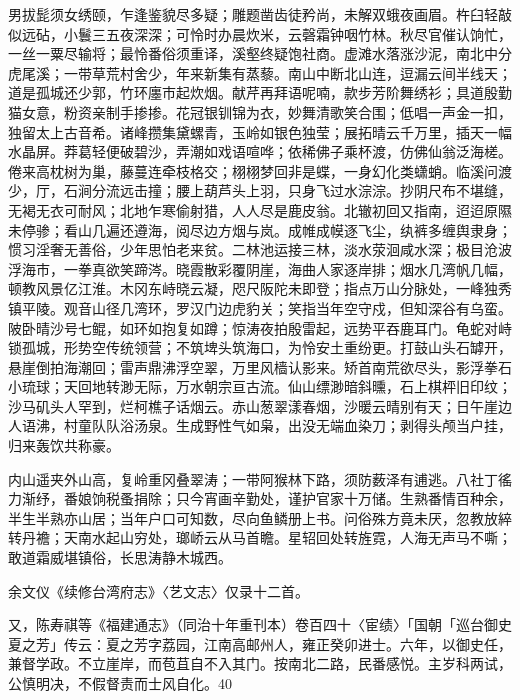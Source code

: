 \noindent 男拔髭须女绣颐，乍逢鉴貌尽多疑；雕题凿齿徒矜尚，未解双蛾夜画眉。杵臼轻敲似远砧，小鬟三五夜深深；可怜时办晨炊米，云磬霜钟咽竹林。秋尽官催认饷忙，一丝一粟尽输将；最怜番俗须重译，溪壑终疑饱社商。虚滩水落涨沙泥，南北中分虎尾溪；一带草荒村舍少，年来新集有蒸藜。南山中断北山连，逗漏云间半线天；道是孤城还少郭，竹环廛市起炊烟。献芹再拜语呢喃，款步芳阶舞绣衫；具道殷勤猫女意，粉资亲制手掺掺。花冠银钏锦为衣，妙舞清歌笑合围；低唱一声金一扣，独留太上古音希。诸峰攒集黛螺青，玉岭如银色独莹；展拓晴云千万里，插天一幅水晶屏。莽葛轻便破碧沙，弄潮如戏语喧哗；依稀佛子乘杯渡，仿佛仙翁泛海槎。倦来高枕树为巢，藤蔓连牵枝格交；栩栩梦回非是蝶，一身幻化类蟏蛸。临溪问渡少，厅，石涧分流远击撞；腰上葫芦头上羽，只身飞过水淙淙。抄阴尺布不堪缝，无褐无衣可耐风；北地乍寒偷射猎，人人尽是鹿皮翁。北辙初回又指南，迢迢原隰未停骖；看山几遍还遵海，阅尽边方烟与岚。成帷成幙逐飞尘，纨裤多缠舆隶身；惯习淫奢无善俗，少年思怕老来贫。二林池运接三林，淡水荥洄咸水深；极目沧波浮海市，一拳真欲笑蹄涔。晓霞散彩覆阴崖，海曲人家逐岸排；烟水几湾帆几幅，顿教风景亿江淮。木冈东峙晓云凝，咫尺阪陀未即登；指点万山分脉处，一峰独秀镇平陵。观音山径几湾环，罗汉门边虎豹关；笑指当年空守戍，但知深谷有乌蛮。陂卧晴沙号七鲲，如环如抱复如蹲；惊涛夜拍殷雷起，远势平吞鹿耳门。龟蛇对峙锁孤城，形势空传统领营；不筑埤头筑海口，为怜安土重纷更。打鼓山头石罅开，悬崖倒拍海潮回；雷声鼎沸浮空翠，万里风樯认影来。矫首南荒欲尽头，影浮拳石小琉球；天回地转渺无际，万水朝宗亘古流。仙山缥渺暗斜曛，石上棋枰旧印纹；沙马矶头人罕到，烂柯樵子话烟云。赤山葱翠漾春烟，沙暖云晴别有天；日午崖边人语沸，村童队队浴汤泉。生成野性气如枭，出没无端血染刀；剥得头颅当户挂，归来轰饮共称豪。


\noindent 内山遥夹外山高，复岭重冈叠翠涛；一带阿猴林下路，须防薮泽有逋逃。八社丁徭力渐纾，番娘饷税蚤捐除；只今宵画辛勤处，谨护官家十万储。生熟番情百种余，半生半熟亦山居；当年户口可知数，尽向鱼鳞册上书。问俗殊方竟未厌，忽教放綷转丹襜；天南水起山穷处，瑯峤云从马首瞻。星轺回处转旌霓，人海无声马不嘶；敢道霜威堪镇俗，长思涛静木城西。

余文仪《续修台湾府志》〈艺文志〉仅录十二首。

又，陈寿祺等《福建通志》（同治十年重刊本）卷百四十〈宦绩〉「国朝「巡台御史夏之芳」传云：夏之芳字荔园，江南高邮州人，雍正癸卯进士。六年，以御史任，兼督学政。不立崖岸，而苞苴自不入其门。按南北二路，民番感悦。主岁科两试，公慎明决，不假督责而士风自化。40


